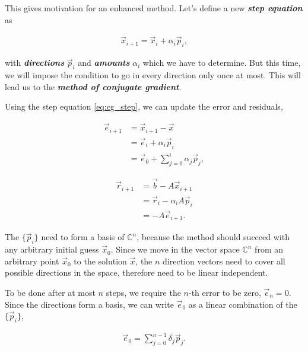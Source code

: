 \documentclass{article}
\theoremstyle{plain} %
\theoremstyle{convention} %
\theoremstyle{remark} %
\def\df#1{\textbf{\textit{#1}}}
\numberwithin{equation}{section}
\begin{document}
This gives motivation for an enhanced method. Let's define a new \df{step equation} as

\begin{align}
    \vec{x}_{i+1} = \vec{x}_i + \alpha_i \vec{p}_i, \label{eq:cg_step}
\end{align}

with \df{directions} $\vec{p}_i$ and \df{amounts} $\alpha_i$ which we have to determine. But this time, we will impose the condition to go in every direction only once at most. This will lead us to the \df{method of conjugate gradient}.

Using the step equation \eqref{eq:cg_step}, we can update the error and residuals,

\begin{subequations}
    \begin{align}
        \vec{e}_{i+1} &= \vec{x}_{i+1} - \vec{x} \\
                      &= \vec{e}_{i} + \alpha_i \vec{p}_{i} \label{eq:cg_error1} \\
                      &= \vec{e}_{0} + \sum_{j=0}^{i} \alpha_j \vec{p}_{j}, \label{eq:cg_error2}
    \end{align}
\end{subequations}

\begin{subequations}
    \begin{align}
        \vec{r}_{i+1} &= \vec{b} - A \vec{x}_{i+1} \label{eq:residual_exact} \\
                      &= \vec{r}_{i} - \alpha_i A \vec{p}_{i} \label{eq:residual_recursive} \\
                      &= - A \vec{e}_{i+1}. \label{eq:residual_exact2}
    \end{align}
\end{subequations}

The $\{\vec{p}_i\}$ need to form a basis of $\mathbb{C}^n$, because the method should succeed with any arbitrary initial guess $\vec{x}_0$. Since we move in the vector space $\mathbb{C}^n$ from an arbitrary point $\vec{x}_0$ to the solution $\vec{x}$, the $n$ direction vectors need to cover all possible directions in the space, therefore need to be linear independent.

To be done after at most $n$ steps, we require the $n$-th error to be zero, $\vec{e}_n = 0$. Since the directions form a basis, we can write $\vec{e}_0$ as a linear combination of the $\{\vec{p}_i\}$,

\begin{align*}
    \vec{e}_{0} = \sum_{j=0}^{n-1} \delta_j \vec{p}_j.
\end{align*}
\end{document}
